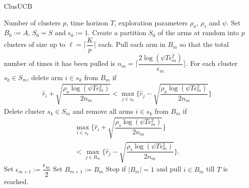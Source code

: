 \begin{algorithm}
\caption{ClusUCB}
\label{alg:clusucb}
\begin{algorithmic}
 Number of clusters $p$, time horizon $T$, exploration parameters $\rho_a$, $\rho_s$ and $\psi$.
 Set $B_{0}:=A$, $S_0 = S$ and $\epsilon_{0}:=1$.
\State Create a partition $S_0$ of the arms at random into $p$ clusters of size up to $\ell=\bigg\lceil \dfrac{K}{p} \bigg\rceil$ each.
\State Pull each arm in $B_m$ so that the total number of times it has been pulled is $n_{m}=\bigg\lceil\dfrac{2\log{(\psi T\epsilon_{m}^{2})}}{\epsilon_{m}}\bigg\rceil$. 
\ArmElim
\State For each cluster $s_k \in S_{m}$, delete arm ${i}\in s_{k}$ from $B_{m}$ if
\begin{align*}
\hat{r}_{i} + \sqrt{\dfrac{\rho_{a}\log{(\psi T\epsilon_{m}^{2})}}{2 n_{m}}}  < \max_{{j}\in s_{k}}\bigg\lbrace\hat{r}_{j} -\sqrt{\dfrac{\rho_{a}\log{(\psi T\epsilon_{m}^{2})}}{2 n_{m}}} \bigg\rbrace
\end{align*}
\EndArmElim
\ClusElim
\State Delete cluster $s_{k}\in S_{m}$ and remove all arms $i\in s_{k}$ from $B_{m}$ if 
\begin{align*}
 \max_{{i}\in s_{k}}\bigg\lbrace\hat{r}_{i} + \sqrt{\dfrac{\rho_{s}\log{(\psi T\epsilon_{m}^{2})}}{2 n_{m}}}\bigg\rbrace  \\
 < \max_{{j}\in B_{m}} \bigg\lbrace\hat{r}_{j} - \sqrt{\dfrac{\rho_{s} \log{(\psi T\epsilon_{m}^{2})}}{2 n_{m}}}\bigg\rbrace.
\end{align*}
\EndClusElim
\State Set $\epsilon_{m+1}:=\dfrac{\epsilon_{m}}{2}$\vspace{0.5ex}
\State Set $B_{m+1}:=B_{m}$
\State Stop if $|B_{m}|=1$ and pull ${i}\in B_{m}$ till $T$ is reached.
\EndFor
\end{algorithmic}
\end{algorithm}

